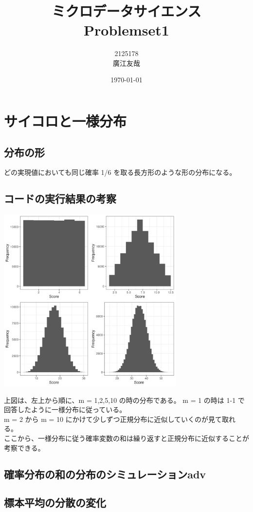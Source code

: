 \documentclass{article}
\begin{document}
\title{ミクロデータサイエンス\\Problemset1}
\author{2125178\\廣江友哉}
\date{\today}
\maketitle


\section{サイコロと一様分布}

\subsection{分布の形}

どの実現値においても同じ確率 1/6 を取る長方形のような形の分布になる。

\subsection{コードの実行結果の考察}
	\begin{center}
		\includegraphics[width=0.7\textwidth]{1-2_plot.png}
	\end{center}

上図は、左上から順に、m = 1,2,5,10 の時の分布である。 
m = 1 の時は 1-1 で回答したように一様分布に従っている。\\
m = 2 から m = 10 にかけて少しずつ正規分布に近似していくのが見て取れる。\\
ここから、一様分布に従う確率変数の和は繰り返すと正規分布に近似することが考察できる。

\subsection{確率分布の和の分布のシミュレーションadv}

\subsection{標本平均の分散の変化}
\end{document}
